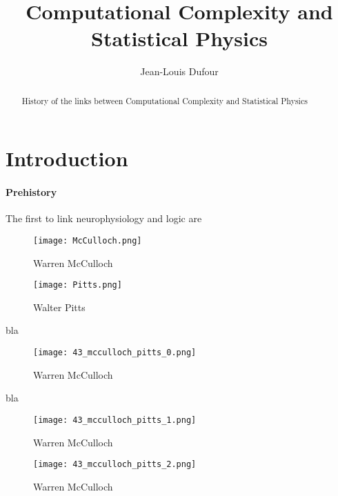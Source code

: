 \documentclass[a4paper]{article}
\title{Computational Complexity and Statistical Physics}
\author{Jean-Louis Dufour}
\begin{document}
\maketitle

\begin{abstract}
History of the links between Computational Complexity and Statistical Physics
\end{abstract}

\section{Introduction} \label{section:Introduction}

\paragraph*{Prehistory}

The first to link neurophysiology and logic are \cite{mcculloch1943logical}

\begin{figure}[h]
  \centering
  \begin{minipage}[b]{0.55\textwidth}
    \texttt{[image: McCulloch.png]}
    \caption{Warren McCulloch}
  \end{minipage}
  \hfill
  \begin{minipage}[b]{0.4\textwidth}
    \texttt{[image: Pitts.png]}
    \caption{Walter Pitts}
  \end{minipage}
\end{figure}

bla

\begin{figure}[h]
\texttt{[image: 43\_mcculloch\_pitts\_0.png]}
\caption{Warren McCulloch}
\end{figure}

bla

\begin{figure}[h]
\texttt{[image: 43\_mcculloch\_pitts\_1.png]}
\caption{Warren McCulloch}
\end{figure}

\begin{figure}[h]
\texttt{[image: 43\_mcculloch\_pitts\_2.png]}
\caption{Warren McCulloch}
\end{figure}
\end{document}
